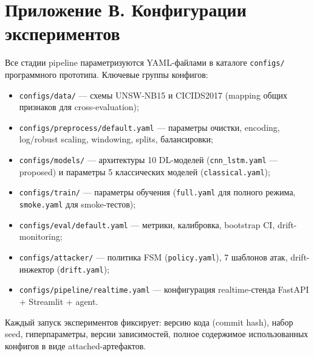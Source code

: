 \section*{Приложение В. Конфигурации экспериментов}
\label{app:configs}

Все стадии pipeline параметризуются YAML-файлами в каталоге
\verb|configs/| программного прототипа. Ключевые группы конфигов:

\begin{itemize}
    \item \verb|configs/data/| --- схемы UNSW-NB15 и CICIDS2017
    (mapping общих признаков для cross-evaluation);
    \item \verb|configs/preprocess/default.yaml| --- параметры
    очистки, encoding, log/robust scaling, windowing, splits,
    балансировки;
    \item \verb|configs/models/| --- архитектуры 10 DL-моделей
    (\verb|cnn_lstm.yaml| --- proposed) и параметры 5 классических
    моделей (\verb|classical.yaml|);
    \item \verb|configs/train/| --- параметры обучения (\verb|full.yaml|
    для полного режима, \verb|smoke.yaml| для smoke-тестов);
    \item \verb|configs/eval/default.yaml| --- метрики, калибровка,
    bootstrap CI, drift-monitoring;
    \item \verb|configs/attacker/| --- политика FSM (\verb|policy.yaml|),
    7 шаблонов атак, drift-инжектор (\verb|drift.yaml|);
    \item \verb|configs/pipeline/realtime.yaml| --- конфигурация
    realtime-стенда FastAPI + Streamlit + agent.
\end{itemize}

Каждый запуск экспериментов фиксирует: версию кода (commit hash),
набор seed, гиперпараметры, версии зависимостей, полное содержимое
использованных конфигов в виде attached-артефактов.

\label{lastfig}
\label{lasttab}
